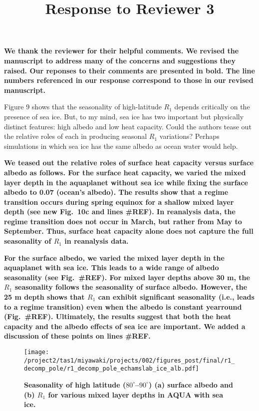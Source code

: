 \documentclass{article}
\title{\vspace{-2.5cm}Response to Reviewer 3\vspace{-2cm}}
\date{}
\author{}
\begin{document}
\maketitle

\textbf{We thank the reviewer for their helpful comments. We revised the manuscript to address many of the concerns and suggestions they raised. Our reponses to their comments are presented in bold. The line numbers referenced in our response correspond to those in our revised manuscript.}

Figure 9 shows that the seasonality of high-latitude $R_1$ depends critically on the presence of sea ice. But, to my mind, sea ice has two important but physically distinct features: high albedo and low heat capacity. Could the authors tease out the relative roles of each in producing seasonal $R_1$ variations? Perhaps simulations in which sea ice has the same albedo as ocean water would help.

\textbf{We teased out the relative roles of surface heat capacity versus surface albedo as follows. For the surface heat capacity, we varied the mixed layer depth in the aquaplanet without sea ice while fixing the surface albedo to 0.07 (ocean's albedo). The results show that a regime transition occurs during spring equinox for a shallow mixed layer depth (see new Fig.~10c and lines \#REF). In reanalysis data, the regime transition does not occur in March, but rather from May to September. Thus, surface heat capacity alone does not capture the full seasonality of $R_1$ in reanalysis data.}

\textbf{For the surface albedo, we varied the mixed layer depth in the aquaplanet with sea ice. This leads to a wide range of albedo seasonality (see Fig.~\#REF). For mixed layer depths above 30 m, the $R_1$ seasonality follows the seasonality of surface albedo. However, the 25 m depth shows that $R_1$ can exhibit significant seasonality (i.e., leads to a regime transition) even when the albedo is constant yearround (Fig.~\#REF). Ultimately, the results suggest that both the heat capacity and the albedo effects of sea ice are important. We added a discussion of these points on lines \#REF.}

\begin{figure}[H]
    \centering
    \noindent\texttt{[image: /project2/tas1/miyawaki/projects/002/figures\_post/final/r1\_decomp\_pole/r1\_decomp\_pole\_echamslab\_ice\_alb.pdf]}
    \caption{\bf Seasonality of high latitude ($80^\circ$--$90^\circ$) (a) surface albedo and (b) $R_1$ for various mixed layer depths in AQUA with sea ice.}
    \label{fig:echam-alb}
\end{figure}
\end{document}
